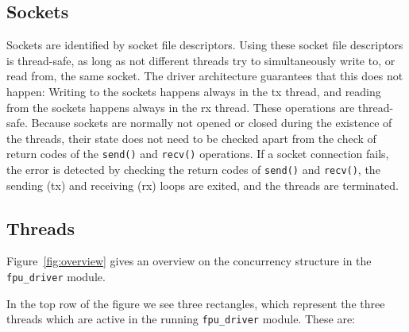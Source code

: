 \documentclass[fontsize=12,a4paper]{scrartcl}
\begin{document}
\subsection{Sockets}


Sockets are identified by socket file descriptors.  Using these socket
file descriptors is thread-safe, as long as not different threads try
to simultaneously write to, or read from, the same socket. The driver
architecture guarantees that this does not happen: Writing to the
sockets happens always in the tx thread, and reading from the sockets
happens always in the rx thread.  These operations are
thread-safe. Because sockets are normally not opened or closed during
the existence of the threads, their state does not need to be checked
apart from the check of return codes of the \texttt{send()} and
\texttt{recv()} operations. If a socket connection fails, the error is
detected by checking the return codes of \texttt{send()} and
\texttt{recv()}, the sending (tx) and receiving (rx) loops are exited,
and the threads are terminated.


\subsection{Threads}
Figure~\ref{fig:overview} gives an overview on the concurrency
structure in the \texttt{fpu\_driver} module.


In the top row of the figure we see three rectangles,
which represent the three threads which are active
in the running \texttt{fpu\_driver} module. These are:
\end{document}
